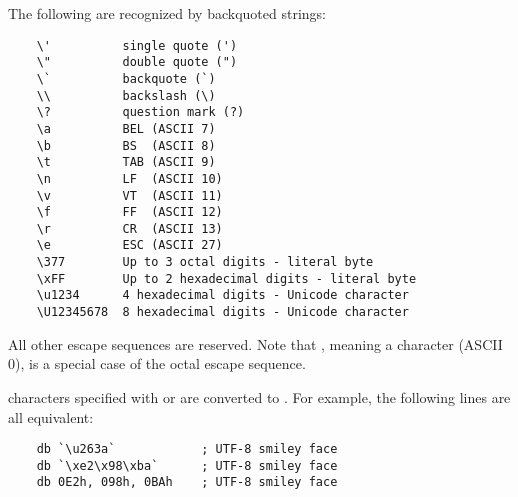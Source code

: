 The following  are recognized by backquoted strings:

\begin{lstlisting}
	\'          single quote (')
	\"          double quote (")
	\`          backquote (`)
	\\          backslash (\)
	\?          question mark (?)
	\a          BEL (ASCII 7)
	\b          BS  (ASCII 8)
	\t          TAB (ASCII 9)
	\n          LF  (ASCII 10)
	\v          VT  (ASCII 11)
	\f          FF  (ASCII 12)
	\r          CR  (ASCII 13)
	\e          ESC (ASCII 27)
	\377        Up to 3 octal digits - literal byte
	\xFF        Up to 2 hexadecimal digits - literal byte
	\u1234      4 hexadecimal digits - Unicode character
	\U12345678  8 hexadecimal digits - Unicode character
\end{lstlisting}

All other escape sequences are reserved. Note that ,
meaning a  character (ASCII 0), is a special case of
the octal escape sequence.

 characters specified with \code{\\u} or \code{\\U}
are converted to . For example, the following lines
are all equivalent:

\begin{lstlisting}
	db `\u263a`            ; UTF-8 smiley face
	db `\xe2\x98\xba`      ; UTF-8 smiley face
	db 0E2h, 098h, 0BAh    ; UTF-8 smiley face
\end{lstlisting}
